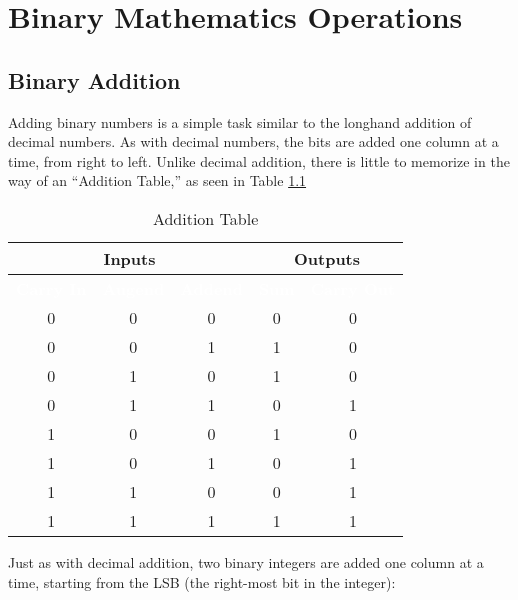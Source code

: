 \chapter{Binary Mathematics Operations}\label{ch03}
\section{Binary Addition}

Adding binary numbers is a simple task similar to the longhand addition of decimal numbers. As with decimal numbers, the bits are added one column at a time, from right to left. Unlike decimal addition, there is little to memorize in the way of an ``Addition Table,'' as seen in Table \ref{MO:tab:binary_addition_table}

\begin{table}[H]
  \sffamily
  \newcommand{\head}[1]{\textcolor{white}{\textbf{#1}}}    
  \begin{center}
    \begin{tabular}{ c c c | c c } \hline
      \multicolumn{3}{c|}{\textbf{Inputs}} & \multicolumn{2}{c}{\textbf{Outputs}} \\
      \hline
      \rowcolor{black!75}
      \head{Carry In} & \head{Augend} & \head{Addend} & \head{Sum} & \head{Carry Out} \\
      \hline
      0        & 0      & 0      & 0   & 0 \\
      0        & 0      & 1      & 1   & 0 \\
      0        & 1      & 0      & 1   & 0 \\
      0        & 1      & 1      & 0   & 1 \\
      1        & 0      & 0      & 1   & 0 \\
      1        & 0      & 1      & 0   & 1 \\
      1        & 1      & 0      & 0   & 1 \\
      1        & 1      & 1      & 1   & 1 \\ \hline
    \end{tabular}
  \end{center}
  \caption{Addition Table}
  \label{MO:tab:binary_addition_table}
\end{table} 

Just as with decimal addition, two binary integers are added one column at a time, starting from the \ac{LSB} (the right-most bit in the integer): 

